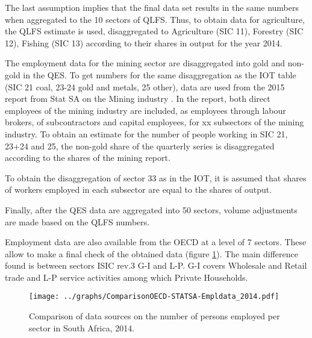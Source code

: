 \documentclass[12pt,english]{article}
\newcommand\lies[2][]{\todo[color=orange!50,#1]{ldf: #2}}
\begin{document}
The last assumption implies that the final data set results in the same numbers when aggregated to the 10 sectors of QLFS. Thus, to obtain data for agriculture, the QLFS estimate is used, disaggregated to Agriculture (SIC 11), Forestry (SIC 12), Fishing (SIC 13) according to their shares in output for the year 2014. 

The employment data for the mining sector are disaggregated into gold and non-gold in the QES. To get numbers for the same disaggregation as the IOT table (SIC 21 coal, 23-24 gold and metals, 25 other), data are used from the 2015 report from Stat SA on the Mining industry \citep{mining2015}. In the report, both direct employees of the mining industry are included, as employees through labour brokers, of subcontractors and capital employees\lies{what are those?}, for xx subsectors of the mining industry. %
To obtain an estimate for the number of people working in SIC 21, 23+24 and 25, the non-gold share of the quarterly series is disaggregated according to the shares of the mining report. 

To obtain the disaggregation of sector 33 as in the IOT, it is assumed that shares of workers employed in each subsector are equal to the shares of output.

Finally, after the QES data are aggregated into 50 sectors, volume adjustments are made based on the QLFS numbers.


Employment data are also available from the OECD at a level of 7 sectors. These allow to make a final check of the obtained data (figure \ref{ComparisonOECD-STATSA-Empldata_2014}). The main difference found is between sectors ISIC rev.3 G-I and L-P. G-I covers Wholesale and Retail trade and L-P service activities among which Private Households. 

\begin{figure}[!h]
	\centering
	\texttt{[image: ../graphs/ComparisonOECD-STATSA-Empldata\_2014.pdf]}
	\caption{\label{ComparisonOECD-STATSA-Empldata_2014}Comparison of data sources on the number of persons employed per sector in South Africa, 2014.}
\end{figure}
\end{document}
